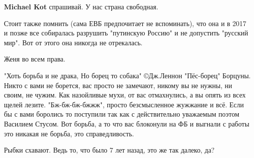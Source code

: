 \begin{itemize}
\begin{itemize}
 
\textbf{Michael Kot} спрашивай. У нас страна свободная.
\end{itemize} %

 
Стоит также помнить (сама ЕВБ предпочитает не вспоминать), что она и в 2017 и позже все собиралась разрушить "путинскую Россию" и не допустить "русский мир". Вот от этого она никогда не отрекалась.

 
Женя во всем права.

 
"Хоть борьба и не драка,
Но борец то собака"
©Дж.Леннон "Пёс-борец"
Борцуны. Никто с вами не борется, вас просто не замечают, никому вы не нужны, ни своим, не чужим. Как назойливые мухи, от вас отмахнулись, а вы опять из всех щелей лезите. "Бж-бж-бж-бжжж", просто безсмысленное жужжание и всё. Если бы с вами боролись то поступили так как с действительно уважаемым поэтом Василием Стусом. Вот борьба, а то что вас блоконули на ФБ и выгнали с работы это никакая не борьба, это справедливость.

 
Рыбки схавают. Ведь то, что было 7 лет назад, это же так далеко, да?


\end{itemize}
